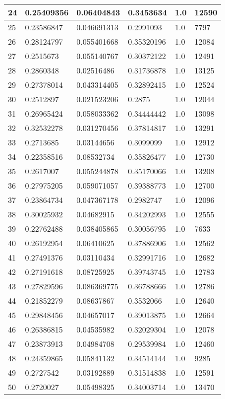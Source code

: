 \begin{longtable}{|l|l|l|l|l|l|}
24 & 0.25409356 & 0.06404843 & 0.3453634 & 1.0 & 12590 \\ \hline 
25 & 0.23586847 & 0.046691313 & 0.2991093 & 1.0 & 7797 \\ \hline 
26 & 0.28124797 & 0.055401668 & 0.35320196 & 1.0 & 12084 \\ \hline 
27 & 0.2515673 & 0.055140767 & 0.30372122 & 1.0 & 12491 \\ \hline 
28 & 0.2860348 & 0.02516486 & 0.31736878 & 1.0 & 13125 \\ \hline 
29 & 0.27378014 & 0.043314405 & 0.32892415 & 1.0 & 12524 \\ \hline 
30 & 0.2512897 & 0.021523206 & 0.2875 & 1.0 & 12044 \\ \hline 
31 & 0.26965424 & 0.058033362 & 0.34444442 & 1.0 & 13098 \\ \hline 
32 & 0.32532278 & 0.031270456 & 0.37814817 & 1.0 & 13291 \\ \hline 
33 & 0.2713685 & 0.03144656 & 0.3099099 & 1.0 & 12912 \\ \hline 
34 & 0.22358516 & 0.08532734 & 0.35826477 & 1.0 & 12730 \\ \hline 
35 & 0.2617007 & 0.055244878 & 0.35170066 & 1.0 & 13208 \\ \hline 
36 & 0.27975205 & 0.059071057 & 0.39388773 & 1.0 & 12700 \\ \hline 
37 & 0.23864734 & 0.047367178 & 0.2982747 & 1.0 & 12096 \\ \hline 
38 & 0.30025932 & 0.04682915 & 0.34202993 & 1.0 & 12555 \\ \hline 
39 & 0.22762488 & 0.038405865 & 0.30056795 & 1.0 & 7633 \\ \hline 
40 & 0.26192954 & 0.06410625 & 0.37886906 & 1.0 & 12562 \\ \hline 
41 & 0.27491376 & 0.03110434 & 0.32991716 & 1.0 & 12682 \\ \hline 
42 & 0.27191618 & 0.08725925 & 0.39743745 & 1.0 & 12783 \\ \hline 
43 & 0.27829596 & 0.086369775 & 0.36788666 & 1.0 & 12786 \\ \hline 
44 & 0.21852279 & 0.08637867 & 0.3532066 & 1.0 & 12640 \\ \hline 
45 & 0.29848456 & 0.04657017 & 0.39013875 & 1.0 & 12664 \\ \hline 
46 & 0.26386815 & 0.04535982 & 0.32029304 & 1.0 & 12078 \\ \hline 
47 & 0.23873913 & 0.04984708 & 0.29539984 & 1.0 & 12460 \\ \hline 
48 & 0.24359865 & 0.05841132 & 0.34514144 & 1.0 & 9285 \\ \hline 
49 & 0.2727542 & 0.03192889 & 0.31514838 & 1.0 & 12591 \\ \hline 
50 & 0.2720027 & 0.05498325 & 0.34003714 & 1.0 & 13470 \\ \hline 
\end{longtable}